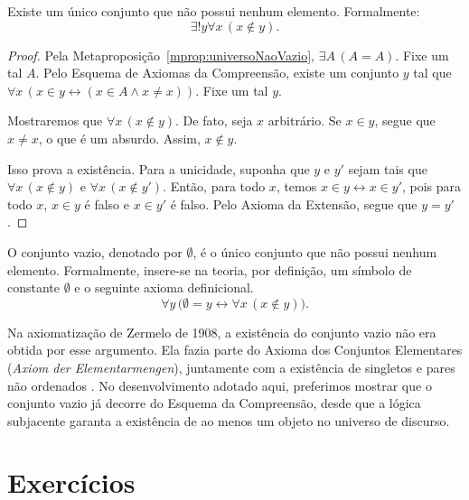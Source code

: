 \begin{proposition}[$\BST$]\label{prop:existenciaConjuntoVazio}
    Existe um único conjunto que não possui nenhum elemento.
    Formalmente:
    \begin{equation}
        \exists! y \forall x\, (x \notin y).
    \end{equation}
\end{proposition}
\begin{proof}
    Pela Metaproposição~\ref{mprop:universoNaoVazio}, $\exists A\, (A = A)$.
    Fixe um tal $A$.
    Pelo Esquema de Axiomas da Compreensão, existe um conjunto $y$ tal que $\forall x\, (x \in y \leftrightarrow (x \in A \land x \neq x))$.
    Fixe um tal $y$.

    Mostraremos que $\forall x\, (x \notin y)$.
    De fato, seja $x$ arbitrário.
    Se $x \in y$, segue que $x \neq x$, o que é um absurdo.
    Assim, $x \notin y$.

    Isso prova a existência.
    Para a unicidade, suponha que $y$ e $y'$ sejam tais que $\forall x\, (x \notin y)$ e $\forall x\, (x \notin y')$.
    Então, para todo $x$, temos $x \in y \leftrightarrow x \in y'$, pois para todo $x$, $x \in y$ é falso e $x \in y'$ é falso.
    Pelo Axioma da Extensão, segue que $y = y'$.
\end{proof}

\begin{definition}[$\BST$]\label{def:conjuntoVazio}
    O conjunto vazio, denotado por $\emptyset$, é o único conjunto que não possui nenhum elemento.
    Formalmente, insere-se na teoria, por definição, um símbolo de constante $\emptyset$ e o seguinte axioma definicional.
    \[
    \forall y\,\bigl(\emptyset=y \leftrightarrow \forall x\,(x\notin y)\bigr).
    \]
\end{definition}

Na axiomatização de Zermelo de 1908, a existência do conjunto vazio não era obtida por esse argumento.
Ela fazia parte do Axioma dos Conjuntos Elementares (\emph{Axiom der Elementarmengen}), juntamente com a existência de singletos e pares não ordenados \cite[p.~263]{zermelo1908untersuchungen}.
No desenvolvimento adotado aqui, preferimos mostrar que o conjunto vazio já decorre do Esquema da Compreensão, desde que a lógica subjacente garanta a existência de ao menos um objeto no universo de discurso.

\section*{Exercícios}

